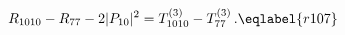 \begin{equation}
R_{1010}-R_{77}-2 |P_{10}|^2=T_{1010}^{(3)}-T^{(3)}_{77}\,.
\eqlabel{r107}
\end{equation}

